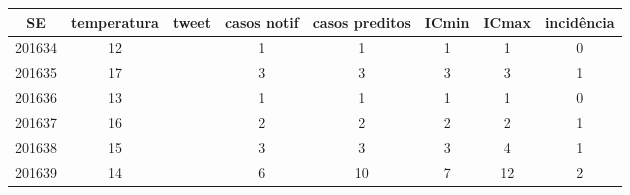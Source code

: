 \begin{tabular}{c|ccccccc}
  \hline
SE & temperatura & tweet & casos notif & casos preditos & ICmin & ICmax & incidência \\ 
  \hline
201634 & 12 &  & 1 & 1 & 1 & 1 & 0 \\ 
  201635 & 17 &  & 3 & 3 & 3 & 3 & 1 \\ 
  201636 & 13 &  & 1 & 1 & 1 & 1 & 0 \\ 
  201637 & 16 &  & 2 & 2 & 2 & 2 & 1 \\ 
  201638 & 15 &  & 3 & 3 & 3 & 4 & 1 \\ 
  201639 & 14 &  & 6 & 10 & 7 & 12 & 2 \\ 
   \hline
\end{tabular}
